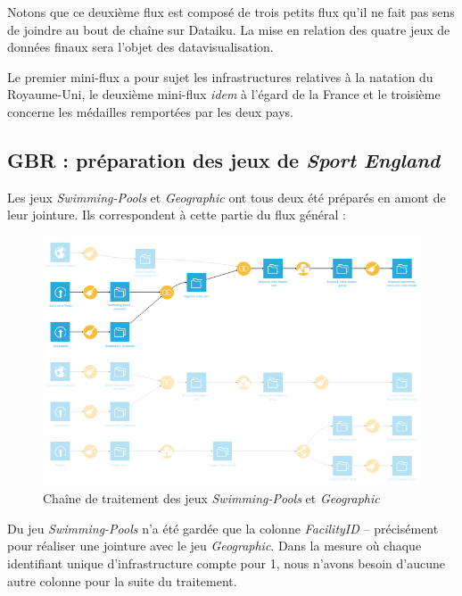 \documentclass[hidelinks, 12pt]{report}
\begin{document}
Notons que ce deuxième flux est composé de trois petits flux qu'il ne fait pas sens de joindre au bout de chaîne sur Dataiku. La mise en relation des quatre jeux de données finaux sera l'objet des datavisualisation.

Le premier mini-flux a pour sujet les infrastructures relatives à la natation du Royaume-Uni, le deuxième mini-flux \textit{idem} à l'égard de la France et le troisième concerne les médailles remportées par les deux pays.





%





\subsection{GBR : préparation des jeux de \textit{Sport England}}

Les jeux \textit{Swimming-Pools} et \textit{Geographic} ont tous deux été préparés en amont de leur jointure. Ils correspondent à cette partie du flux général :

\begin{center}
	\begin{figure}[H]
		\setlength{\belowcaptionskip}{-35pt}
		\includegraphics[scale=0.55]{images/flow-swim-eng-sport.png}
		\caption{Chaîne de traitement des jeux \textit{Swimming-Pools} et \textit{Geographic}}
	\end{figure}
\end{center}

Du jeu \textit{Swimming-Pools} n'a été gardée que la colonne \textit{FacilityID} -- précisément pour réaliser une jointure avec le jeu \textit{Geographic}. Dans la mesure où chaque identifiant unique d'infrastructure compte pour 1, nous n'avons besoin d'aucune autre colonne pour la suite du traitement.
\end{document}
